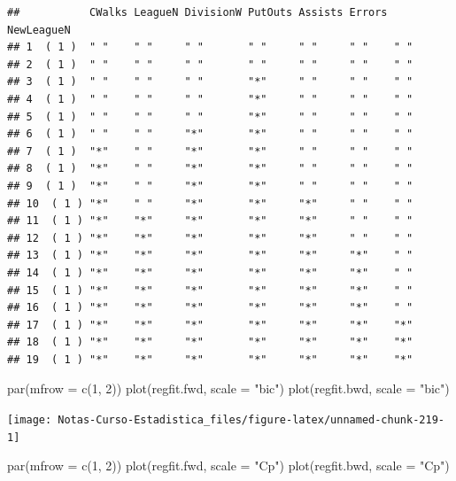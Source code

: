 \documentclass[
  12pt,
]{book}
\newenvironment{Shaded}{\begin{snugshade}}{\end{snugshade}}
\newcommand{\AttributeTok}[1]{\textcolor[rgb]{0.77,0.63,0.00}{#1}}
\newcommand{\DecValTok}[1]{\textcolor[rgb]{0.00,0.00,0.81}{#1}}
\newcommand{\FunctionTok}[1]{\textcolor[rgb]{0.00,0.00,0.00}{#1}}
\newcommand{\NormalTok}[1]{#1}
\newcommand{\StringTok}[1]{\textcolor[rgb]{0.31,0.60,0.02}{#1}}
\begin{document}
\begin{verbatim}
##           CWalks LeagueN DivisionW PutOuts Assists Errors NewLeagueN
## 1  ( 1 )  " "    " "     " "       " "     " "     " "    " "       
## 2  ( 1 )  " "    " "     " "       " "     " "     " "    " "       
## 3  ( 1 )  " "    " "     " "       "*"     " "     " "    " "       
## 4  ( 1 )  " "    " "     " "       "*"     " "     " "    " "       
## 5  ( 1 )  " "    " "     " "       "*"     " "     " "    " "       
## 6  ( 1 )  " "    " "     "*"       "*"     " "     " "    " "       
## 7  ( 1 )  "*"    " "     "*"       "*"     " "     " "    " "       
## 8  ( 1 )  "*"    " "     "*"       "*"     " "     " "    " "       
## 9  ( 1 )  "*"    " "     "*"       "*"     " "     " "    " "       
## 10  ( 1 ) "*"    " "     "*"       "*"     "*"     " "    " "       
## 11  ( 1 ) "*"    "*"     "*"       "*"     "*"     " "    " "       
## 12  ( 1 ) "*"    "*"     "*"       "*"     "*"     " "    " "       
## 13  ( 1 ) "*"    "*"     "*"       "*"     "*"     "*"    " "       
## 14  ( 1 ) "*"    "*"     "*"       "*"     "*"     "*"    " "       
## 15  ( 1 ) "*"    "*"     "*"       "*"     "*"     "*"    " "       
## 16  ( 1 ) "*"    "*"     "*"       "*"     "*"     "*"    " "       
## 17  ( 1 ) "*"    "*"     "*"       "*"     "*"     "*"    "*"       
## 18  ( 1 ) "*"    "*"     "*"       "*"     "*"     "*"    "*"       
## 19  ( 1 ) "*"    "*"     "*"       "*"     "*"     "*"    "*"
\end{verbatim}

\begin{Shaded}
\begin{Highlighting}[]
\FunctionTok{par}\NormalTok{(}\AttributeTok{mfrow =} \FunctionTok{c}\NormalTok{(}\DecValTok{1}\NormalTok{, }\DecValTok{2}\NormalTok{))}
\FunctionTok{plot}\NormalTok{(regfit.fwd, }\AttributeTok{scale =} \StringTok{"bic"}\NormalTok{)}
\FunctionTok{plot}\NormalTok{(regfit.bwd, }\AttributeTok{scale =} \StringTok{"bic"}\NormalTok{)}
\end{Highlighting}
\end{Shaded}

\begin{center}\texttt{[image: Notas-Curso-Estadistica\_files/figure-latex/unnamed-chunk-219-1]} \end{center}

\begin{Shaded}
\begin{Highlighting}[]
\FunctionTok{par}\NormalTok{(}\AttributeTok{mfrow =} \FunctionTok{c}\NormalTok{(}\DecValTok{1}\NormalTok{, }\DecValTok{2}\NormalTok{))}
\FunctionTok{plot}\NormalTok{(regfit.fwd, }\AttributeTok{scale =} \StringTok{"Cp"}\NormalTok{)}
\FunctionTok{plot}\NormalTok{(regfit.bwd, }\AttributeTok{scale =} \StringTok{"Cp"}\NormalTok{)}
\end{Highlighting}
\end{Shaded}
\end{document}
